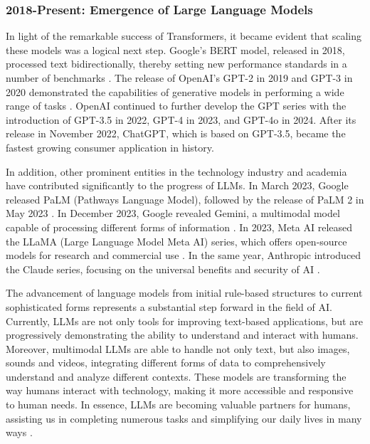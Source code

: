 \subsubsection{2018-Present: Emergence of Large Language Models}

In light of the remarkable success of Transformers, it became evident that scaling these models was a logical next step. Google's BERT model, released in 2018, processed text bidirectionally, thereby setting new performance standards in a number of benchmarks \cite{devlin2018bert}. The release of OpenAI's GPT-2 in 2019 and GPT-3 in 2020 demonstrated the capabilities of generative models in performing a wide range of tasks \cite{radford2019language}. OpenAI continued to further develop the GPT series with the introduction of GPT-3.5 in 2022, GPT-4 in 2023, and GPT-4o in 2024. After its release in November 2022, ChatGPT, which is based on GPT-3.5, became the fastest growing consumer application in history.

In addition, other prominent entities in the technology industry and academia have contributed significantly to the progress of LLMs. In March 2023, Google released PaLM (Pathways Language Model), followed by the release of PaLM 2 in May 2023 \cite{chowdhery2023palm}. In December 2023, Google revealed Gemini, a multimodal model capable of processing different forms of information \cite{team2023gemini}. In 2023, Meta AI released the LLaMA (Large Language Model Meta AI) series, which offers open-source models for research and commercial use \cite{touvron2023llama}. In the same year, Anthropic introduced the Claude series, focusing on the universal benefits and security of AI \cite{anthropic2024claude}.

The advancement of language models from initial rule-based structures to current sophisticated forms represents a substantial step forward in the field of AI. Currently, LLMs are not only tools for improving text-based applications, but are progressively demonstrating the ability to understand and interact with humans. Moreover, multimodal LLMs are able to handle not only text, but also images, sounds and videos, integrating different forms of data to comprehensively understand and analyze different contexts. These models are transforming the way humans interact with technology, making it more accessible and responsive to human needs. In essence, LLMs are becoming valuable partners for humans, assisting us in completing numerous tasks and simplifying our daily lives in many ways \cite{researchgraph2024}.

